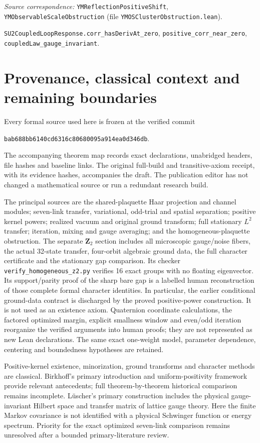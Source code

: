 \documentclass[11pt]{article}
\newcommand{\code}[1]{{\small\nolinkurl{#1}}}
\begin{document}
\par\noindent\begingroup\small\raggedright
\textit{Source correspondence:} \code{YMReflectionPositiveShift},
\code{YMObservableScaleObstruction} (file \code{YMOSClusterObstruction.lean}).
\par\noindent
\code{SU2CoupledLoopResponse.corr_hasDerivAt_zero},
\code{positive_corr_near_zero}, \code{coupledLaw_gauge_invariant}.
\par\endgroup

\section{Provenance, classical context and remaining boundaries}
Every formal source used here is frozen at the verified commit
\begin{center}\code{bab688bb6140cd6316c80680095a914ea0d346db}.\end{center}
The accompanying theorem map records exact declarations, unabridged
headers, file hashes and baseline links. The original full-build and
transitive-axiom receipt, with its evidence hashes, accompanies the
draft. The publication editor has not changed a mathematical source
or run a redundant research build.

The principal sources are the shared-plaquette Haar projection and
channel modules; seven-link transfer, variational, odd-trial and spatial
separation; positive kernel powers; realized vacuum and original ground
transform; full stationary $L^2$ transfer; iteration, mixing and gauge
averaging; and the homogeneous-plaquette obstruction. The separate $\mathbf Z_2$ section includes all microscopic gauge/noise fibers, the actual 32-state transfer, four-orbit algebraic ground data, the full character certificate and the stationary gap comparison. Its checker \texttt{verify\_homogeneous\_z2.py} verifies 16 exact groups with no floating eigenvector. Its support/parity proof of the sharp bare gap is a labelled human reconstruction of those complete formal character identities.
In particular, the earlier conditional ground-data contract is
discharged by the proved positive-power construction. It is not used
as an existence axiom. Quaternion coordinate calculations, the factored
optimized margin, explicit smallness window and even/odd iteration
reorganize the verified arguments into human proofs; they are not
represented as new Lean declarations. The same exact one-weight model,
parameter dependence, centering and boundedness hypotheses are retained.

Positive-kernel existence, minorization, ground transforms and character
methods are classical. Birkhoff's primary introduction and
uniform-positivity framework \cite{Birkhoff} provide relevant antecedents;
full theorem-by-theorem historical comparison remains incomplete.
L\"uscher's primary construction \cite{Luscher} includes the physical
gauge-invariant Hilbert space and transfer matrix of lattice gauge
theory. Here the finite Markov covariance is not identified with a
physical Schwinger function or energy spectrum. Priority for the exact
optimized seven-link comparison remains unresolved after a bounded
primary-literature review.
\end{document}
